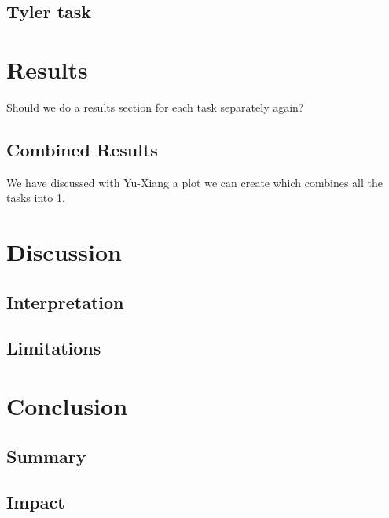 \documentclass[12pt,letterpaper]{article}
\begin{document}
\subsection{Tyler task}





\section{Results}

Should we do a results section for each task separately again?


\subsection{Combined Results}

We have discussed with Yu-Xiang a plot we can create which combines all the tasks into 1. 



\section{Discussion}


\subsection{Interpretation}


\subsection{Limitations}




\section{Conclusion}


\subsection{Summary}


\subsection{Impact}
\end{document}
